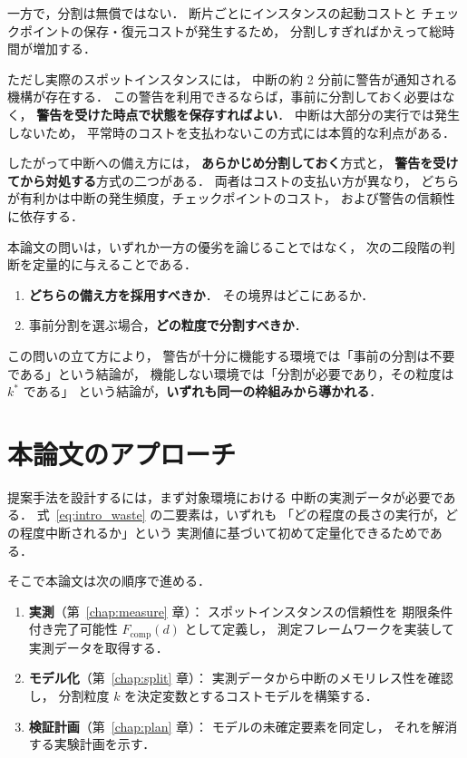 \documentclass[11pt,a4paper]{ltjsreport}
\newcommand{\Fcomp}{F_{\mathrm{comp}}}
\begin{document}
一方で，分割は無償ではない．
断片ごとにインスタンスの起動コストと
チェックポイントの保存・復元コストが発生するため，
分割しすぎればかえって総時間が増加する．

ただし実際のスポットインスタンスには，
中断の約 2 分前に警告が通知される機構が存在する．
この警告を利用できるならば，事前に分割しておく必要はなく，
\textbf{警告を受けた時点で状態を保存すればよい}．
中断は大部分の実行では発生しないため，
平常時のコストを支払わないこの方式には本質的な利点がある．

したがって中断への備え方には，
\textbf{あらかじめ分割しておく}方式と，
\textbf{警告を受けてから対処する}方式の二つがある．
両者はコストの支払い方が異なり，
どちらが有利かは中断の発生頻度，チェックポイントのコスト，
および警告の信頼性に依存する．

本論文の問いは，いずれか一方の優劣を論じることではなく，
次の二段階の判断を定量的に与えることである．

\begin{enumerate}
  \item \textbf{どちらの備え方を採用すべきか}．
        その境界はどこにあるか．
  \item 事前分割を選ぶ場合，\textbf{どの粒度で分割すべきか}．
\end{enumerate}

この問いの立て方により，
警告が十分に機能する環境では「事前の分割は不要である」という結論が，
機能しない環境では「分割が必要であり，その粒度は $k^{*}$ である」
という結論が，\textbf{いずれも同一の枠組みから導かれる}．

\section{本論文のアプローチ}

提案手法を設計するには，まず対象環境における
中断の実測データが必要である．
式~\eqref{eq:intro_waste} の二要素は，いずれも
「どの程度の長さの実行が，どの程度中断されるか」という
実測値に基づいて初めて定量化できるためである．

そこで本論文は次の順序で進める．

\begin{enumerate}
  \item \textbf{実測}（第~\ref{chap:measure} 章）：
        スポットインスタンスの信頼性を
        期限条件付き完了可能性 $\Fcomp(d)$ として定義し，
        測定フレームワークを実装して実測データを取得する．
  \item \textbf{モデル化}（第~\ref{chap:split} 章）：
        実測データから中断のメモリレス性を確認し，
        分割粒度 $k$ を決定変数とするコストモデルを構築する．
  \item \textbf{検証計画}（第~\ref{chap:plan} 章）：
        モデルの未確定要素を同定し，
        それを解消する実験計画を示す．
\end{enumerate}
\end{document}
